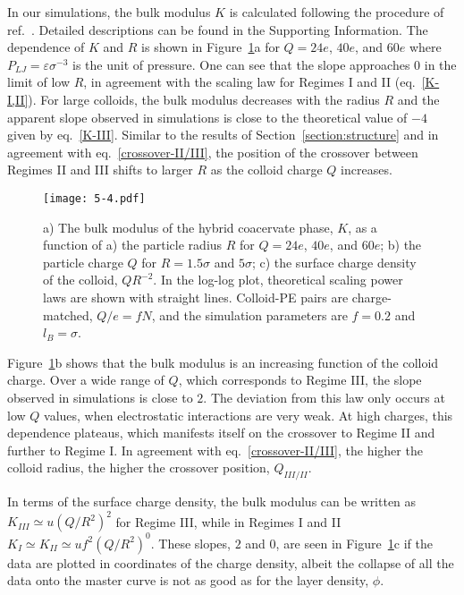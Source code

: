 \documentclass[journal=mamobx, manuscript=article]{achemso}
\begin{document}
In our simulations, the bulk modulus $K$ is calculated following the procedure of ref.~. Detailed descriptions can be found in the Supporting Information. The dependence of $K$ and $R$ is shown in Figure~\ref{fig:bulk}a for $Q = 24e$, $40e$, and $60e$ where $P_{LJ} = \varepsilon\sigma^{-3}$ is the unit of pressure. One can see that the slope approaches $0$ in the limit of low $R$, in agreement with the scaling law for Regimes I and II (eq.~\ref{K-I,II}). For large colloids, the bulk modulus decreases with the radius $R$ and the apparent slope observed in simulations is close to the theoretical value of $-4$ given by eq.~\ref{K-III}. Similar to the results of Section~\ref{section:structure} and in agreement with eq.~\ref{crossover-II/III}, the position of the crossover between Regimes II and III shifts to larger $R$ as the colloid charge $Q$ increases.


\begin{figure}[ht]
\centering
\texttt{[image: 5-4.pdf]}
\caption{a) The bulk modulus of the hybrid coacervate phase, $K$, as a function of 
a) the particle radius $R$ for $Q = 24e$, $40e$, and $60e$;
b) the particle charge $Q$ for $R = 1.5\sigma$ and $5\sigma$;
c) the surface charge density of the colloid, $QR^{-2}$.
In the log-log plot, theoretical scaling power laws are shown with straight lines. Colloid-PE pairs are charge-matched, $Q/e = fN$, and the simulation parameters are $f = 0.2$ and $l_{B} = \sigma$.}
\label{fig:bulk}
\end{figure}

Figure~\ref{fig:bulk}b shows that the bulk modulus is an increasing function of the colloid charge. Over a wide range of $Q$, which corresponds to Regime III, the slope observed in simulations is close to $2$. The deviation from this law only occurs at low $Q$ values, when electrostatic interactions are very weak. At high charges, this dependence plateaus, which manifests itself on the crossover to Regime II and further to Regime I. In agreement with eq.~\ref{crossover-II/III}, the higher the colloid radius, the higher the crossover position, $Q_{III/II}$. 


In terms of the surface charge density, the bulk modulus can be written as $K_{III} \simeq u \left( Q / R^2 \right)^{2}$ for Regime III, while in Regimes I and II $K_{I} \simeq K_{II} \simeq u f^2 \left( Q / R^2 \right)^{0} $. These slopes, $2$ and $0$, are seen in Figure~\ref{fig:bulk}c if the data are plotted in coordinates of the charge density, albeit the collapse of all the data onto the master curve is not as good as for the layer density, $\phi$.
\end{document}
